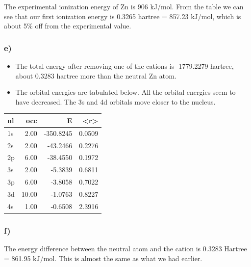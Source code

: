 \documentclass[11pt]{article}
\begin{document}
The experimental ionization energy of Zn is 906 kJ/mol. From the table we can see that our first ionization energy is 0.3265 hartree = 857.23 kJ/mol, which is about 5\% off from the experimental value. 

\subsubsection{e)}
\label{sec-2-1-5}

\begin{itemize}
\item The total energy after removing one of the cations is -1779.2279 hartree, about 0.3283 hartree more than the neutral Zn atom.

\item The orbital energies are tabulated below. All the orbital energies seem to have decreased. The 3s and 4d orbitals move closer to the nucleus.
\end{itemize}

\begin{center}
\begin{tabular}{lrrr}
nl & occ & E & <r>\\
\hline
1s & 2.00 & -350.8245 & 0.0509\\
2s & 2.00 & -43.2466 & 0.2276\\
2p & 6.00 & -38.4550 & 0.1972\\
3s & 2.00 & -5.3839 & 0.6811\\
3p & 6.00 & -3.8058 & 0.7022\\
3d & 10.00 & -1.0763 & 0.8227\\
4s & 1.00 & -0.6508 & 2.3916\\
\end{tabular}
\end{center}

\subsubsection{f)}
\label{sec-2-1-6}

The energy difference between the neutral atom and the cation is 0.3283 Hartree = 861.95 kJ/mol. This is almost the same as what we had earlier.
\end{document}
